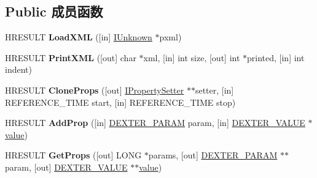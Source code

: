 \subsection*{Public 成员函数}
\begin{DoxyCompactItemize}
\item 
\mbox{\label{interface_i_property_setter_a8a2b3a786f4bfb1cd7188b84f163d2e4}} 
H\+R\+E\+S\+U\+LT {\bfseries Load\+X\+ML} (\mbox{[}in\mbox{]} \hyperlink{interface_i_unknown}{I\+Unknown} $\ast$pxml)
\item 
\mbox{\label{interface_i_property_setter_af574decc741efc4c2e855a93866c1f0c}} 
H\+R\+E\+S\+U\+LT {\bfseries Print\+X\+ML} (\mbox{[}out\mbox{]} char $\ast$xml, \mbox{[}in\mbox{]} int size, \mbox{[}out\mbox{]} int $\ast$printed, \mbox{[}in\mbox{]} int indent)
\item 
\mbox{\label{interface_i_property_setter_ad12d2ed10ae8255b8db7fa6ef8479cb4}} 
H\+R\+E\+S\+U\+LT {\bfseries Clone\+Props} (\mbox{[}out\mbox{]} \hyperlink{interface_i_property_setter}{I\+Property\+Setter} $\ast$$\ast$setter, \mbox{[}in\mbox{]} R\+E\+F\+E\+R\+E\+N\+C\+E\+\_\+\+T\+I\+ME start, \mbox{[}in\mbox{]} R\+E\+F\+E\+R\+E\+N\+C\+E\+\_\+\+T\+I\+ME stop)
\item 
\mbox{\label{interface_i_property_setter_a0622fef8378010a6a8da23807430967d}} 
H\+R\+E\+S\+U\+LT {\bfseries Add\+Prop} (\mbox{[}in\mbox{]} \hyperlink{struct_d_e_x_t_e_r___p_a_r_a_m}{D\+E\+X\+T\+E\+R\+\_\+\+P\+A\+R\+AM} param, \mbox{[}in\mbox{]} \hyperlink{struct_d_e_x_t_e_r___v_a_l_u_e}{D\+E\+X\+T\+E\+R\+\_\+\+V\+A\+L\+UE} $\ast$\hyperlink{unionvalue}{value})
\item 
\mbox{\label{interface_i_property_setter_a7c7c3a23630df9419cb86b32af504a51}} 
H\+R\+E\+S\+U\+LT {\bfseries Get\+Props} (\mbox{[}out\mbox{]} L\+O\+NG $\ast$params, \mbox{[}out\mbox{]} \hyperlink{struct_d_e_x_t_e_r___p_a_r_a_m}{D\+E\+X\+T\+E\+R\+\_\+\+P\+A\+R\+AM} $\ast$$\ast$param, \mbox{[}out\mbox{]} \hyperlink{struct_d_e_x_t_e_r___v_a_l_u_e}{D\+E\+X\+T\+E\+R\+\_\+\+V\+A\+L\+UE} $\ast$$\ast$\hyperlink{unionvalue}{value})
\item 
\mbox{\label{interface_i_property_setter_a3eb14758caecb363ac2f021657655824}} 
$$
\end{DoxyCompactItemize}
